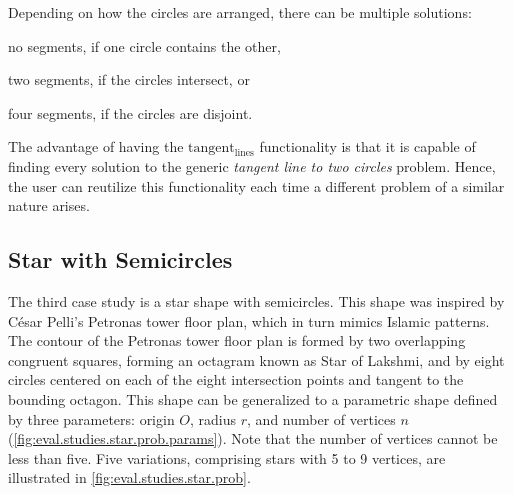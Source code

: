 Depending on how the circles are arranged, there can be multiple solutions:
\begin{enumerate*}[label= (\arabic*)]
  \item no segments, if one circle contains the other,
  \item two segments, if the circles intersect, or
  \item four segments, if the circles are disjoint.
\end{enumerate*}
The advantage of having the $\operatorname{tangent_{lines}}$ functionality is
that it is capable of finding every solution to the generic \textit{tangent line
to two circles} problem.  Hence, the user can reutilize this functionality each
time a different problem of a similar nature arises.

\subsection{Star with Semicircles}%
\label{sec:eval.studies.star}

The third case study is a star shape with semicircles.  This shape was inspired
by César Pelli's Petronas tower floor plan, which in turn mimics Islamic
patterns.  The contour of the Petronas tower floor plan is formed by two
overlapping congruent squares, forming an octagram known as Star of Lakshmi, and
by eight circles centered on each of the eight intersection points and tangent
to the bounding octagon.  This shape can be generalized to a parametric shape
defined by three parameters: origin $O$, radius $r$, and number of vertices $n$
(\cref{fig:eval.studies.star.prob.params}).  Note that the number of vertices
cannot be less than five.  Five variations, comprising stars with 5 to 9
vertices, are illustrated in \cref{fig:eval.studies.star.prob}.

